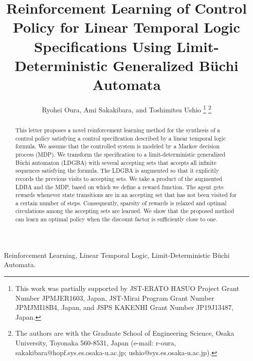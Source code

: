 \documentclass[letterpaper, 10 pt, conference]{ieeeconf}  %
\title{\LARGE \bf
Reinforcement Learning of Control Policy for Linear Temporal Logic Specifications Using Limit-Deterministic Generalized B\"{u}chi Automata
}
\author{Ryohei Oura, Ami Sakakibara, and Toshimitsu Ushio%
\thanks{This work was partially supported by JST-ERATO HASUO Project Grant Number JPMJER1603, Japan, JST-Mirai Program Grant Number JPMJMI18B4, Japan, and JSPS KAKENHI Grant Number JP19J13487, Japan.}%
\thanks{The authors are with the Graduate School of Engineering Science, Osaka University, Toyonaka 560-8531, Japan (e-mail: {r-oura, sakakibara}@hopf.sys.es.osaka-u.ac.jp; ushio@sys.es.osaka-u.ac.jp).}%
}
\begin{document}
\maketitle
\thispagestyle{empty}
\pagestyle{empty}

\begin{abstract}

This letter proposes a novel reinforcement learning method for the synthesis of a control policy satisfying a control specification described by a linear temporal logic formula.  We assume that the controlled system is modeled by a Markov decision process (MDP).
We transform the specification to a limit-deterministic generalized B\"{u}chi automaton (LDGBA) with several accepting sets that accepts all infinite sequences satisfying the formula.
The LDGBA is augmented so that it explicitly records the previous visits to accepting sets.
We take a product of the augmented LDBA and the MDP, based on which we define a reward function. The agent gets rewards whenever state transitions are in an accepting set that has not been visited for a certain number of steps.
Consequently, sparsity of rewards is relaxed and optimal circulations among the accepting sets are learned. We show that the proposed method can learn an optimal policy when the discount factor is sufficiently close to one.
\end{abstract}

\begin{keywords}
  Reinforcement Learning, Linear Temporal Logic, Limit-Deterministic B\"{u}chi Automata.
\end{keywords}

\end{document}
